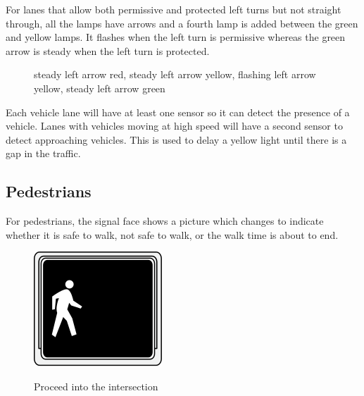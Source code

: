 \documentclass[letterpaper,twoside]{article}
\begin{document}
For lanes that allow both permissive and protected left turns but not
straight through, all the lamps have arrows and
a fourth lamp is added between the green and yellow lamps.  It flashes
when the left turn is permissive whereas the green arrow is steady
when the left turn is protected.

\begin{figure}[H]
           {\caption{steady left arrow red, steady left arrow yellow, flashing
               left arrow yellow, steady left arrow green}\label{four_B}}
\end{figure}

Each vehicle lane will have at least one sensor so it can detect the
presence of a vehicle.  Lanes with vehicles moving at high speed will
have a second sensor to detect approaching vehicles.  This is used to
delay a yellow light until there is a gap in the traffic.

\subsection{Pedestrians}
For pedestrians, the signal face shows a picture which changes to indicate
whether it is safe to walk, not safe to walk, or the walk time is about to end.

\begin{figure}[H]
  \fcapside
           {\includegraphics{MUTCD_Ped_Signal_-_Walk}}
           {\caption{Proceed into the intersection}}
\end{figure}
\end{document}
